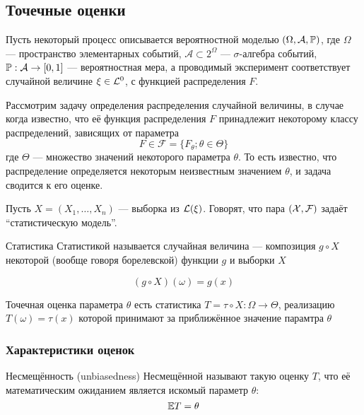 \subsection{Точечные оценки}

Пусть некоторый процесс
описывается вероятностной моделью $(\Omega, \mathcal A, \mathbb P)$,
где $\Omega$ --- пространство элементарных событий,
$\mathcal A \subset 2^\Omega$ --- $\sigma$-алгебра событий,
${\mathbb P: \mathcal A\to \left[{0, 1}\right]}$ --- вероятностная мера,
а проводимый эксперимент соответствует случайной величине $\xi\in\mathcal L^{0}$,
с функцией распределения $F$.

Рассмотрим задачу определения распределения случайной величины,
в случае когда известно,
что её функция распределения $F$
принадлежит некоторому классу распределений,
зависящих от параметра
$$F\in\mathcal F = \{F_\theta; \theta\in\Theta\}$$
где $\Theta$ --- множество значений некоторого параметра $\theta$.
То есть известно,
что распределение определяется некоторым неизвестным значением $\theta$,
и задача сводится к его оценке.

Пусть $X = (X_1, \dotsc, X_n)$ --- выборка из $\mathcal L(\xi)$.
Говорят, что пара $(\mathcal X, \mathcal F)$ задаёт ``статистическую модель''.

\begin{dfn}{Статистика}
Статистикой называется случайная величина
--- композиция $g\circ X$ некоторой
(вообще говоря борелевской) функции $g$ и выборки $X$

$$(g\circ X)(\omega) = g(x)$$
\end{dfn}

\begin{dfn}{Точечная оценка параметра $\theta$}
есть статистика ${T = \tau\circ X: \Omega\to\Theta}$,
реализацию $T(\omega) = \tau(x)$ которой принимают за приближённое значение парамтра $\theta$
\end{dfn}

\subsubsection{Характеристики оценок}

\begin{dfn}{Несмещённость (unbiasedness)}
Несмещённой называют такую оценку $T$,
что её математическим ожиданием является искомый параметр $\theta$:
$$\mathbb E T = \theta$$

\end{dfn}

